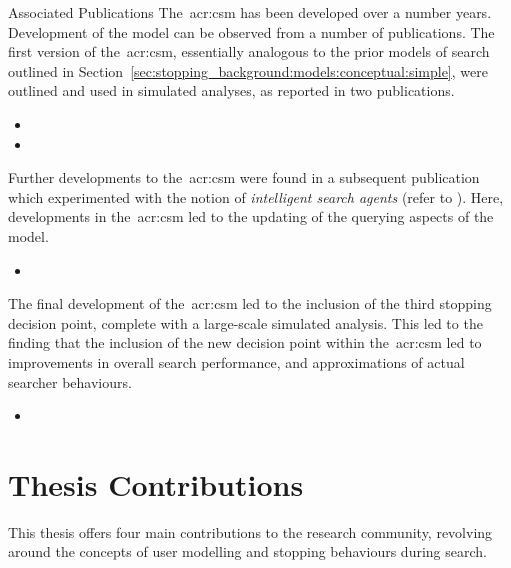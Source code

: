\vspace*{5mm}
\begin{publications_box}{Associated Publications}
The~\gls{acr:csm} has been developed over a number years. Development of the model can be observed from a number of publications. The first version of the~\gls{acr:csm}, essentially analogous to the prior models of search outlined in Section~\ref{sec:stopping_background:models:conceptual:simple}, were outlined and used in simulated analyses, as reported in two publications.

\begin{itemize}
    \item{}
    \item{}
\end{itemize}

Further developments to the~\gls{acr:csm} were found in a subsequent publication which experimented with the notion of \emph{intelligent search agents} (refer to ). Here, developments in the~\gls{acr:csm} led to the updating of the querying aspects of the model.

\begin{itemize}
    \item{}
\end{itemize}

The final development of the~\gls{acr:csm} led to the inclusion of the third stopping decision point, complete with a large-scale simulated analysis. This led to the finding that the inclusion of the new decision point within the~\gls{acr:csm} led to improvements in overall search performance, and approximations of actual searcher behaviours.

\begin{itemize}
    \item{}
\end{itemize}
\end{publications_box}

\section{Thesis Contributions}
This thesis offers four main contributions to the research community, revolving around the concepts of user modelling and stopping behaviours during search.

